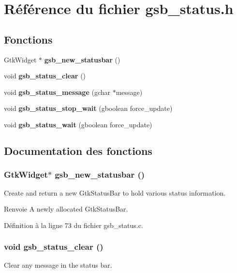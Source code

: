 \section{Référence du fichier gsb\_\-status.h}
\label{gsb__status_8h}
\subsection*{Fonctions}
\begin{DoxyCompactItemize}
\item 
GtkWidget $\ast$ {\bf gsb\_\-new\_\-statusbar} ()
\item 
void {\bf gsb\_\-status\_\-clear} ()
\item 
void {\bf gsb\_\-status\_\-message} (gchar $\ast$message)
\item 
void {\bf gsb\_\-status\_\-stop\_\-wait} (gboolean force\_\-update)
\item 
void {\bf gsb\_\-status\_\-wait} (gboolean force\_\-update)
\end{DoxyCompactItemize}


\subsection{Documentation des fonctions}
\subsubsection[{gsb\_\-new\_\-statusbar}]{\setlength{\rightskip}{0pt plus 5cm}GtkWidget$\ast$ gsb\_\-new\_\-statusbar ()}\label{gsb__status_8h_afefc29293b2b4910c410f379629d4086}
Create and return a new GtkStatusBar to hold various status information.

\begin{DoxyReturn}{Renvoie}
A newly allocated GtkStatusBar. 
\end{DoxyReturn}


Définition à la ligne 73 du fichier gsb\_\-status.c.

\subsubsection[{gsb\_\-status\_\-clear}]{\setlength{\rightskip}{0pt plus 5cm}void gsb\_\-status\_\-clear ()}\label{gsb__status_8h_ae0a64a6da0c88a30c75e64e06c734aec}
Clear any message in the status bar. 

